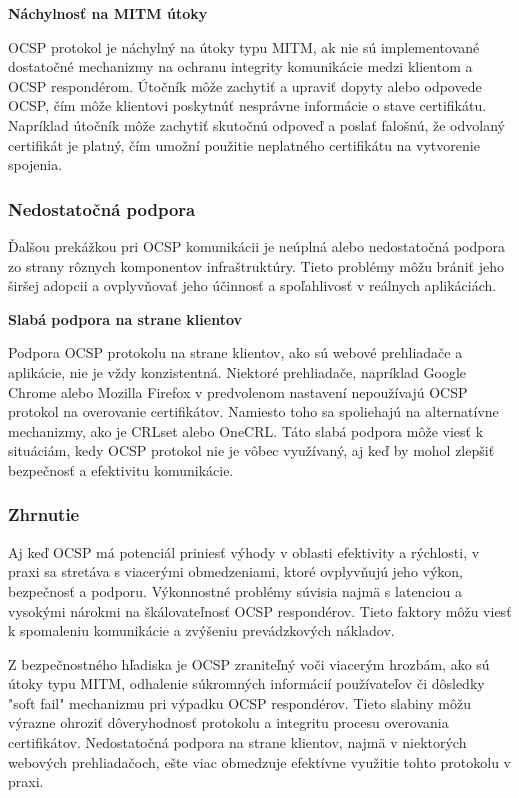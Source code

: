 \documentclass[12pt, twoside]{book}
\newcommand{\subsubsubsection}[1]{%
  \vspace{0.2em}  
  \textbf{#1} \\[0.2em]
  \hspace*{\parindent}
}
\begin{document}
\subsubsubsection{Náchylnosť na MITM útoky}
OCSP protokol je náchylný na útoky typu MITM, ak nie sú implementované dostatočné mechanizmy na ochranu integrity komunikácie medzi klientom a OCSP respondérom. Útočník môže zachytiť a upraviť dopyty alebo odpovede OCSP, čím môže klientovi poskytnúť nesprávne informácie o stave certifikátu. Napríklad útočník môže zachytiť skutočnú odpoveď a poslať falošnú, že odvolaný certifikát je platný, čím umožní použitie neplatného certifikátu na vytvorenie spojenia.\cite{eddie}

\subsubsection{Nedostatočná podpora}
Ďalšou prekážkou pri OCSP komunikácii je neúplná alebo nedostatočná podpora zo strany rôznych komponentov infraštruktúry. Tieto problémy môžu brániť jeho širšej adopcii a ovplyvňovať jeho účinnosť a spoľahlivosť v reálnych aplikáciách.


\subsubsubsection{Slabá podpora na strane klientov}
Podpora OCSP protokolu na strane klientov, ako sú webové prehliadače a aplikácie, nie je vždy konzistentná. Niektoré prehliadače, napríklad Google Chrome alebo Mozilla  Firefox v predvolenom nastavení nepoužívajú OCSP protokol na overovanie certifikátov. Namiesto toho sa spoliehajú na alternatívne mechanizmy, ako je CRLset alebo OneCRL.\cite{turin} Táto slabá podpora môže viesť k situáciám, kedy OCSP protokol nie je vôbec využívaný, aj keď by mohol zlepšiť bezpečnosť a efektivitu komunikácie.


\subsubsection{Zhrnutie}
Aj keď OCSP má potenciál priniesť výhody v oblasti efektivity a rýchlosti, v praxi sa stretáva s viacerými obmedzeniami, ktoré ovplyvňujú jeho výkon, bezpečnosť a podporu. Výkonnostné problémy súvisia najmä s latenciou a vysokými nárokmi na škálovateľnosť OCSP respondérov. Tieto faktory môžu viesť k spomaleniu komunikácie a zvýšeniu prevádzkových nákladov.

Z bezpečnostného hľadiska je OCSP zraniteľný voči viacerým hrozbám, ako sú útoky typu MITM, odhalenie súkromných informácií používateľov či dôsledky "soft fail" mechanizmu pri výpadku OCSP respondérov. Tieto slabiny môžu výrazne ohroziť dôveryhodnosť protokolu a integritu procesu overovania certifikátov. Nedostatočná podpora na strane klientov, najmä v niektorých webových prehliadačoch, ešte viac obmedzuje efektívne využitie tohto protokolu v praxi.
\end{document}
